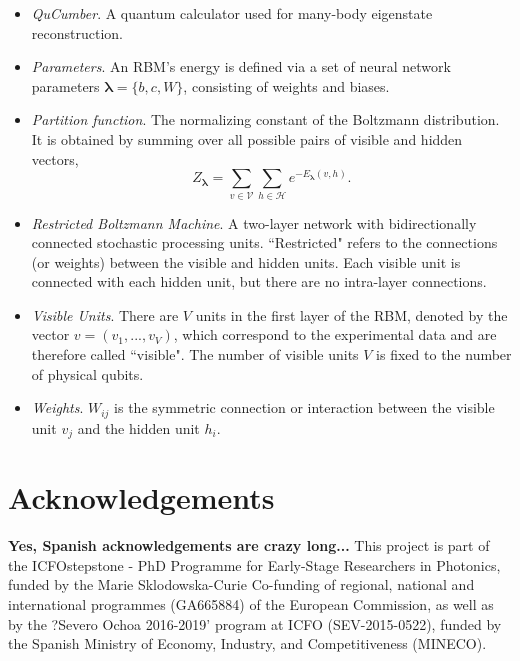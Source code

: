 \documentclass[submission, Phys]{SciPost}
\begin{document}
\begin{itemize}
\item {\it QuCumber}. A quantum calculator used for many-body eigenstate reconstruction.

\item {\it Parameters}.  An RBM's energy is defined via a set of neural network parameters $\bm{\lambda} = \{b,c,W\}$, consisting of weights and biases.

\item {\it Partition function}. The normalizing constant of the Boltzmann distribution.  It is obtained by summing over all possible pairs of visible and hidden vectors,
\begin{equation}
    Z_{\bm{\lambda}} = \sum\limits_{v\in \mathcal{V}}\sum\limits_{h\in \mathcal{H}} e^{-E_{\bm{\lambda}}(v,h)}.
\end{equation}

\item {\it Restricted Boltzmann Machine}.  A two-layer network with bidirectionally connected stochastic processing units.  ``Restricted" refers to the connections (or weights) between the visible and hidden units. Each visible unit is connected with each hidden unit, but there are no intra-layer connections.

\item {\it Visible Units}.  There are $V$ units in the first layer of the RBM, denoted by the vector $v=(v_1, ..., v_V)$, which correspond to the experimental data and are therefore called ``visible".  The number of visible units $V$ is fixed to the number of physical qubits.

\item {\it Weights}.  $W_{ij}$ is the symmetric connection or interaction between the visible unit $v_j$ and the hidden unit $h_i$.

\end{itemize}


\section*{Acknowledgements}
\textbf{Yes, Spanish acknowledgements are crazy long...}
This project is part of the ICFOstepstone - PhD Programme for Early-Stage Researchers in Photonics, funded by the Marie Sklodowska-Curie Co-funding of regional, national and international programmes (GA665884) of the European Commission, as well as by the ?Severo Ochoa 2016-2019' program at ICFO (SEV-2015-0522), funded by the Spanish Ministry of Economy, Industry, and Competitiveness (MINECO).
\end{document}
